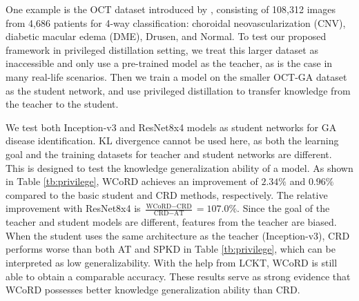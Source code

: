 \documentclass[final]{cvpr}
\theoremstyle{definition}
\begin{document}
One example is the OCT dataset introduced by \cite{kermany2018identifying}, consisting of 108,312 images from 4,686 patients for 4-way classification: choroidal neovascularization (CNV), diabetic macular edema (DME), Drusen, and Normal.
To test our proposed framework in privileged distillation setting, we treat this larger dataset as inaccessible and only use a pre-trained model as the teacher, as is the case in many real-life scenarios. Then we train a model on the smaller OCT-GA dataset as the student network, and use privileged distillation to transfer knowledge from the teacher to the student.

We test both Inception-v3 and ResNet8x4 models as student networks for GA disease identification. 
KL divergence cannot be used here, as both the learning goal and the training datasets for teacher and student networks are different.
This is designed to test the knowledge generalization ability of a model. 
As shown in Table \ref{tb:privilege}, WCoRD achieves an improvement of $2.34\%$ and $0.96\%$ compared to the basic student and CRD methods, respectively.
The relative improvement with ResNet8x4 is $\frac{\text{WCoRD} - \text{CRD}}{\text{CRD}-\text{AT}}=107.0\%$.
Since the goal of the teacher and student models are different, features from the teacher are biased.
When the student uses the same architecture as the teacher (Inception-v3), CRD performs worse than both AT and SPKD in Table \ref{tb:privilege}, which can be interpreted as low generalizability. With the help from LCKT, WCoRD is still able to obtain a comparable accuracy.
These results serve as strong evidence that WCoRD possesses better knowledge generalization ability than CRD. 

\begin{table}[t!]
\begin{center}
\caption{
\small {AUC (\%) of student network ResNet-8x4 with different weights on the local knowledge transfer term.}
    }
\label{tb:privilege_ablation}
\end{center}
\vspace{-6mm}
\end{table} 
\end{document}
